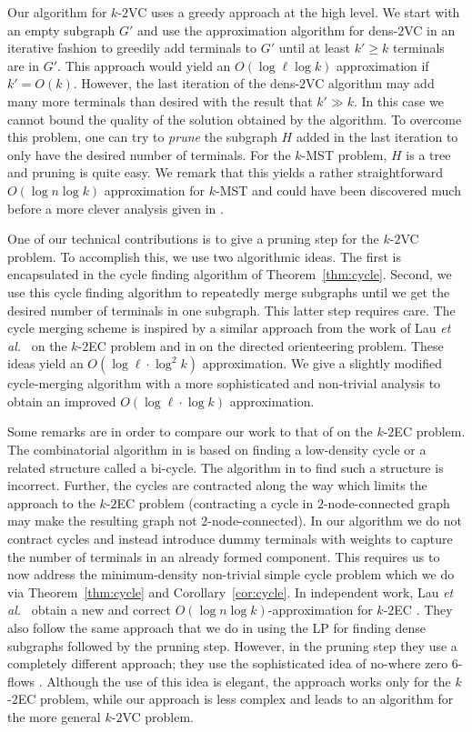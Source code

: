 \documentclass[11pt]{article}
\newcommand{\etal}{{\em et al.}\ }
\newcommand{\kec}[1]{$k$-$#1${\sc EC} }
\newcommand{\kvc}[1]{$k$-$#1${\sc VC} }
\newcommand{\ke}{\kec{2}}
\newcommand{\kv}{\kvc{2}}
\newcommand{\densV}{dens-$2${\sc VC} }
\begin{document}
Our algorithm for \kv uses a greedy approach at the high level. We
start with an empty subgraph $G'$ and use the approximation algorithm
for \densV in an iterative fashion to greedily add terminals to $G'$
until at least $k' \ge k$ terminals are in $G'$. This approach would
yield an $O(\log \ell \log k)$ approximation if $k' = O(k)$. However,
the last iteration of the \densV algorithm may add many more terminals
than desired with the result that $k' \gg k$. In this case we cannot
bound the quality of the solution obtained by the algorithm.  To
overcome this problem, one can try to {\em prune} the subgraph $H$
added in the last iteration to only have the desired number of
terminals. For the $k$-MST problem, $H$ is a tree and pruning is
quite easy. We remark that this yields a rather straightforward
$O(\log n \log k)$ approximation for $k$-MST and could have been
discovered much before a more clever analysis given in
\cite{AwerbuchABV95}.

One of our technical contributions is to give a pruning step for the
\kv problem. To accomplish this, we use two algorithmic ideas. The
first is encapsulated in the cycle finding algorithm of
Theorem~\ref{thm:cycle}.  Second, we use this cycle finding algorithm
to repeatedly merge subgraphs until we get the desired number of
terminals in one subgraph. This latter step requires care. The cycle
merging scheme is inspired by a similar approach from the work of Lau
\etal \cite{LauNSS07} on the \ke problem and in \cite{ChekuriKP08} on
the directed orienteering problem. These ideas yield an $O(\log \ell
\cdot \log^2 k)$ approximation. We give a slightly modified
cycle-merging algorithm with a more sophisticated and non-trivial
analysis to obtain an improved $O(\log \ell \cdot \log k)$
approximation.

Some remarks are in order to compare our work to that of
\cite{LauNSS07} on the \ke problem. The combinatorial algorithm in
\cite{LauNSS07} is based on finding a low-density
cycle or a related structure called a bi-cycle. The algorithm in
\cite{LauNSS07} to find such a structure is incorrect.  Further, the
cycles are contracted along the way which limits the approach to the
\ke problem (contracting a cycle in $2$-node-connected graph may make
the resulting graph not $2$-node-connected).  In our algorithm we do
not contract cycles and instead introduce dummy terminals with weights
to capture the number of terminals in an already formed component.
This requires us to now address the minimum-density non-trivial simple
cycle problem which we do via Theorem~\ref{thm:cycle} and
Corollary~\ref{cor:cycle}. In independent work, Lau \etal
\cite{LauNSS07b} obtain a new and correct $O(\log n \log
k)$-approximation for \ke.  They also follow the same approach that we
do in using the LP for finding dense subgraphs followed by the pruning
step.  However, in the pruning step they use a completely different
approach; they use the sophisticated idea of no-where zero $6$-flows
\cite{Seymour}. Although the use of this idea is elegant, the approach
works only for the \ke problem, while our approach is less complex
and leads to an algorithm for the more general \kv problem.
\end{document}
